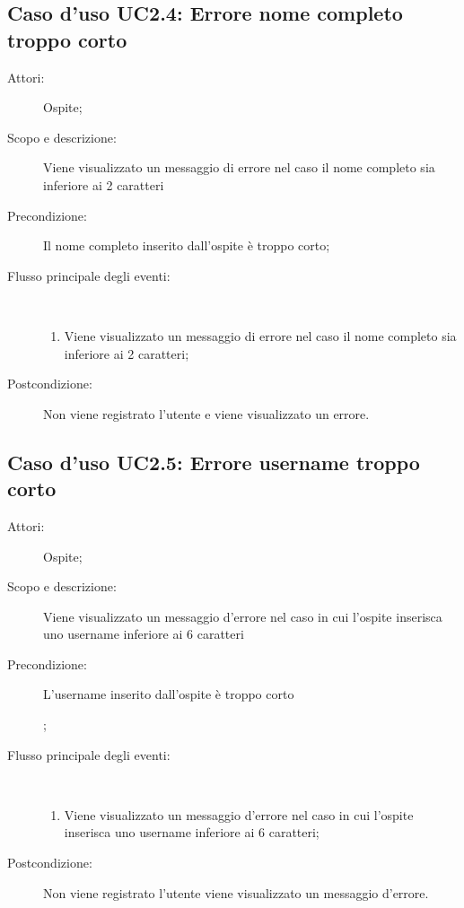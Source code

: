 \subsection{Caso d'uso UC2.4: Errore nome completo troppo corto}\begin{description}
\item[Attori:] Ospite;
\item[Scopo e descrizione:] Viene visualizzato un messaggio di errore nel caso il nome completo sia inferiore ai 2 caratteri
      \item[Precondizione:] Il nome completo inserito dall'ospite è troppo corto;

        \item[Flusso principale degli eventi:] \ 
 \begin{enumerate}
          \item Viene visualizzato un messaggio di errore nel caso il nome completo sia inferiore ai 2 caratteri;

      \end{enumerate}
    \item[Postcondizione:] Non viene registrato l'utente e viene visualizzato un errore.
  \end{description}
\hypertarget{UC2.5}{}
\subsection{Caso d'uso UC2.5: Errore username troppo corto}\begin{description}
\item[Attori:] Ospite;
\item[Scopo e descrizione:] Viene visualizzato un messaggio d'errore nel caso in cui l'ospite inserisca uno username inferiore ai 6 caratteri
      \item[Precondizione:] L'username inserito dall'ospite è troppo corto

;

        \item[Flusso principale degli eventi:] \ 
 \begin{enumerate}
          \item Viene visualizzato un messaggio d'errore nel caso in cui l'ospite inserisca uno username inferiore ai 6 caratteri;

      \end{enumerate}
    \item[Postcondizione:] Non viene registrato l'utente viene visualizzato un messaggio d'errore.
  \end{description}
\hypertarget{UC2.6}{}
